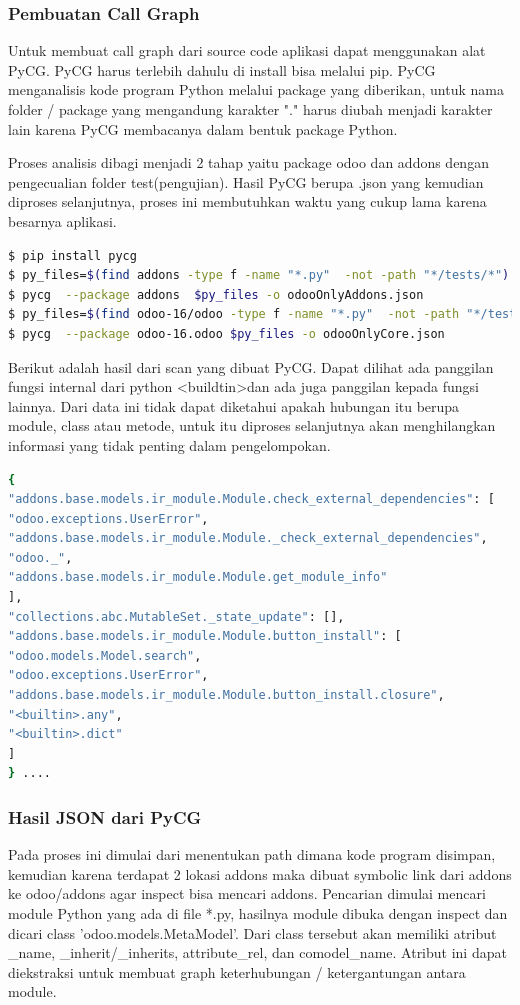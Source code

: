 \subsubsection{Pembuatan Call Graph}
Untuk membuat call graph dari source code aplikasi dapat menggunakan alat PyCG. PyCG harus terlebih dahulu di install bisa melalui pip. PyCG menganalisis kode program Python melalui package yang diberikan, untuk nama folder / package yang mengandung karakter "." harus diubah menjadi karakter lain karena PyCG membacanya dalam bentuk package Python. 

Proses analisis dibagi menjadi 2 tahap yaitu package odoo dan addons dengan pengecualian folder test(pengujian). Hasil PyCG berupa .json yang kemudian diproses selanjutnya, proses ini membutuhkan waktu yang cukup lama karena besarnya aplikasi.
\begin{lstlisting}[style=mystyle, language=sh, caption={Shell Script untuk pembuatan call graph}]
$ pip install pycg
$ py_files=$(find addons -type f -name "*.py"  -not -path "*/tests/*")
$ pycg  --package addons  $py_files -o odooOnlyAddons.json
$ py_files=$(find odoo-16/odoo -type f -name "*.py"  -not -path "*/tests/*")
$ pycg  --package odoo-16.odoo $py_files -o odooOnlyCore.json
\end{lstlisting}
Berikut adalah hasil dari scan yang dibuat PyCG. Dapat dilihat ada panggilan fungsi internal dari python  \textless buildtin\textgreater dan ada juga panggilan kepada fungsi lainnya. Dari data ini tidak dapat diketahui apakah hubungan itu berupa module, class atau metode, untuk itu diproses selanjutnya akan menghilangkan informasi yang tidak penting dalam pengelompokan.

\begin{lstlisting}[style=mystyle, language=sh, caption={Shell Script untuk pembuatan call graph}]
{
"addons.base.models.ir_module.Module.check_external_dependencies": [
"odoo.exceptions.UserError",
"addons.base.models.ir_module.Module._check_external_dependencies",
"odoo._",
"addons.base.models.ir_module.Module.get_module_info"
],
"collections.abc.MutableSet._state_update": [],
"addons.base.models.ir_module.Module.button_install": [
"odoo.models.Model.search",
"odoo.exceptions.UserError",
"addons.base.models.ir_module.Module.button_install.closure",
"<builtin>.any",
"<builtin>.dict"
]
} ....
\end{lstlisting}


\subsubsection{Hasil JSON dari PyCG}
Pada proses ini dimulai dari menentukan path dimana kode program disimpan, kemudian karena terdapat 2 lokasi addons maka dibuat symbolic link dari addons ke odoo/addons agar inspect bisa mencari addons. Pencarian dimulai mencari module Python yang ada di file *.py, hasilnya module dibuka dengan inspect dan dicari class 'odoo.models.MetaModel'. Dari class tersebut akan memiliki atribut {\_}name, {\_}inherit/{\_}inherits, attribute{\_}rel, dan comodel{\_}name. Atribut ini dapat diekstraksi untuk membuat graph keterhubungan / ketergantungan antara module.

